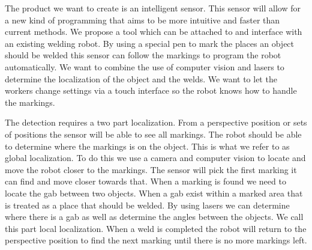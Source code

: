 
The product we want to create is an intelligent sensor.
This sensor will allow for a new kind of programming that aims to be more intuitive and faster than current methods.
We propose a tool which can be attached to and interface with an existing welding robot. 
By using a special pen to mark the places an object should be welded this sensor can follow the markings to program the robot automatically.
We want to combine the use of computer vision and lasers to determine the localization of the object and the welds.
We want to let the workers change settings via a touch interface so the robot knows how to handle the markings. 

The detection requires a two part localization. 
From a perspective position or sets of positions the sensor will be able to see all markings.
The robot should be able to determine where the markings is on the object. 
This is what we refer to as global localization.
To do this we use a camera and computer vision to locate and move the robot closer to the markings.
The sensor will pick the first marking it can find and move closer towards that. 
When a marking is found we need to locate the gab between two objects. 
When a gab exist within a marked area that is treated as a place that should be welded.
By using lasers we can determine where there is a gab as well as determine the angles between the objects.
We call this part local localization.
When a weld is completed the robot will return to the perspective position to find the next marking until there is no more markings left.
